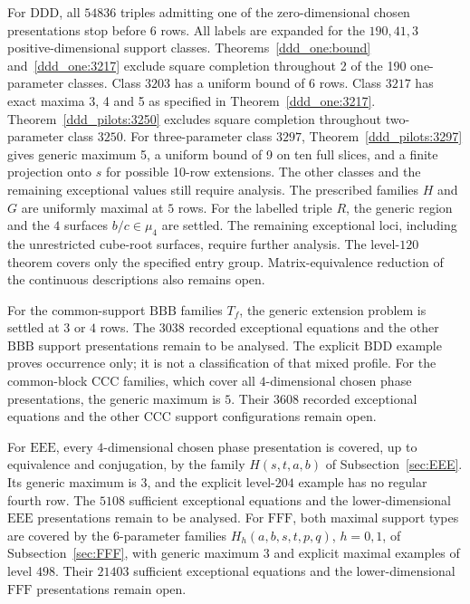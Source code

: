 \documentclass[11pt,a4paper]{article}
\theoremstyle{plain}
\theoremstyle{definition}
\theoremstyle{plain}
\begin{document}
For $\mathrm{DDD}$, all $54836$ triples admitting one of the zero-dimensional chosen presentations stop before $6$ rows. All labels are expanded for the $190,41,3$ positive-dimensional support classes. Theorems~\ref{ddd_one:bound} and~\ref{ddd_one:3217} exclude square completion throughout 2 of the 190 one-parameter classes. Class $3203$ has a uniform bound of 6 rows. Class $3217$ has exact maxima 3, 4 and 5 as specified in Theorem~\ref{ddd_one:3217}. Theorem~\ref{ddd_pilots:3250} excludes square completion throughout two-parameter class $3250$. For three-parameter class $3297$, Theorem~\ref{ddd_pilots:3297} gives generic maximum 5, a uniform bound of 9 on ten full slices, and a finite projection onto $s$ for possible 10-row extensions. The other classes and the remaining exceptional values still require analysis. The prescribed families $H$ and $G$ are uniformly maximal at $5$ rows. For the labelled triple $R$, the generic region and the $4$ surfaces $b/c\in\mu_4$ are settled. The remaining exceptional loci, including the unrestricted cube-root surfaces, require further analysis. The level-$120$ theorem covers only the specified entry group. Matrix-equivalence reduction of the continuous descriptions also remains open.

For the common-support $\mathrm{BBB}$ families $T_f$, the generic extension problem is settled at $3$ or $4$ rows. The $3038$ recorded exceptional equations and the other $\mathrm{BBB}$ support presentations remain to be analysed. The explicit $\mathrm{BDD}$ example proves occurrence only; it is not a classification of that mixed profile. For the common-block $\mathrm{CCC}$ families, which cover all $4$-dimensional chosen phase presentations, the generic maximum is $5$. Their $3608$ recorded exceptional equations and the other $\mathrm{CCC}$ support configurations remain open.

For $\mathrm{EEE}$, every $4$-dimensional chosen phase presentation is covered, up to equivalence and conjugation, by the family $H(s,t,a,b)$ of Subsection~\ref{sec:EEE}. Its generic maximum is $3$, and the explicit level-$204$ example has no regular fourth row. The $5108$ sufficient exceptional equations and the lower-dimensional $\mathrm{EEE}$ presentations remain to be analysed. For $\mathrm{FFF}$, both maximal support types are covered by the 6-parameter families $H_h(a,b,s,t,p,q)$, $h=0,1$, of Subsection~\ref{sec:FFF}, with generic maximum $3$ and explicit maximal examples of level $498$. Their $21403$ sufficient exceptional equations and the lower-dimensional $\mathrm{FFF}$ presentations remain open.
\end{document}
